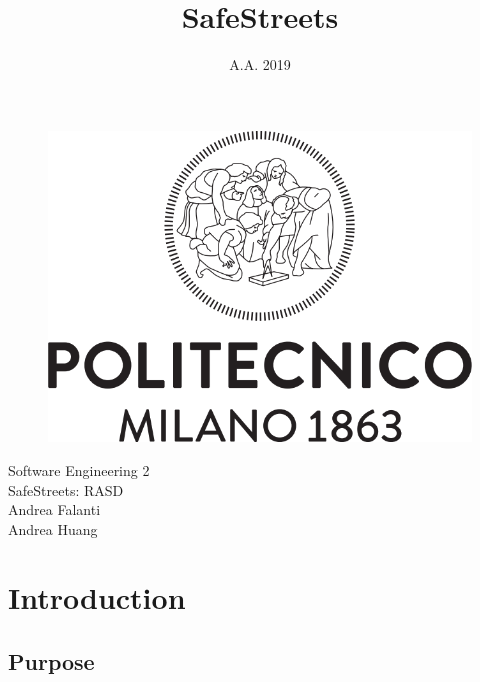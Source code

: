\documentclass[12pt]{article}
\title{SafeStreets}
\date{A.A. 2019}
\begin{document}
\clearpage
\begin{figure}
    \centering
    \includegraphics[width=\linewidth]{Logo_Politecnico_Milano.png}
    \label{fig:my_label}
\end{figure}


{
    \centering
    \Huge Software Engineering 2\\
    \Huge SafeStreets: RASD\\
    
    \large Andrea Falanti\\
    \large Andrea Huang
    \par
}
    
\thispagestyle{empty}

\newpage
\section{Introduction}
    \subsection{Purpose}
\end{document}
